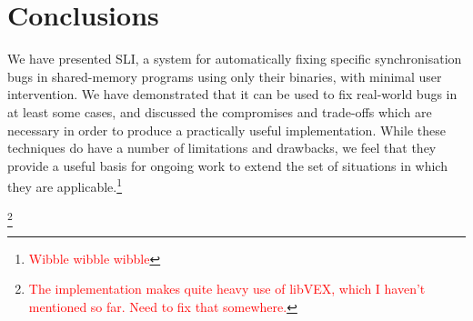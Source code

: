 \documentclass[10pt,twocolumn,preprint,natbib,authoryear]{sigplanconf}
\newcommand{\editorial}[1]{\textcolor{red}{\footnote{\textcolor{red}{#1}}}}
\begin{document}
\section{Conclusions}

We have presented SLI, a system for automatically fixing specific
synchronisation bugs in shared-memory programs using only their
binaries, with minimal user intervention.  We have demonstrated that
it can be used to fix real-world bugs in at least some cases, and
discussed the compromises and trade-offs which are necessary in order
to produce a practically useful implementation.  While these
techniques do have a number of limitations and drawbacks, we feel that
they provide a useful basis for ongoing work to extend the set of
situations in which they are applicable.\editorial{Wibble wibble
  wibble}

\acks

\editorial{The implementation makes quite heavy use of libVEX, which I
  haven't mentioned so far.  Need to fix that somewhere.}



    
\end{document}

